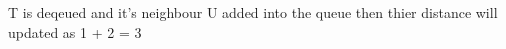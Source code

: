 \documentclass[preview]{standalone}
\begin{document}
\begin{center}
T is deqeued and it's neighbour U added into the queue then thier distance will updated as 1 + 2 = 3
\end{center}
\end{document}
